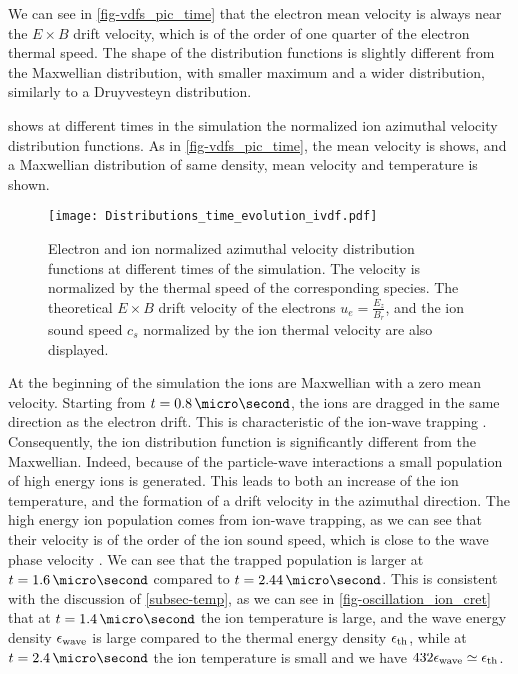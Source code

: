   We can see in \cref{fig-vdfs_pic_time} that the electron mean velocity is always near the $E \times B$ drift velocity, which is of the order of one quarter of the electron thermal speed.
  The shape of the distribution functions is slightly different from the Maxwellian distribution, with smaller maximum and a wider distribution, similarly to a Druyvesteyn distribution.
  
   shows at different times in the simulation the normalized ion azimuthal velocity distribution functions.
  As in \cref{fig-vdfs_pic_time}, the mean velocity is shows, and a Maxwellian distribution of same density, mean velocity and temperature is shown.


  
  \begin{figure}[!hbt]
    \centering
    \texttt{[image: Distributions\_time\_evolution\_ivdf.pdf]}
    \caption{Electron and ion normalized azimuthal velocity distribution functions at different times of the simulation. The velocity is normalized by the thermal speed of the corresponding species. The theoretical $E\times B$ drift velocity of the electrons $u_e = \frac{E_z}{B_r}$, and the ion sound speed $c_s$ normalized by the ion thermal velocity are also displayed.}
    \label{fig-ivdfs_pic_time}
  \end{figure}
  
  At the beginning of the simulation the ions are Maxwellian with a zero mean velocity.
  Starting from $t=0.8\,\micro\second$, the ions are dragged in the same direction as the electron drift.
  This is characteristic of the ion-wave trapping \citep{lafleur2017a}.
  Consequently, the ion distribution function is significantly different from the Maxwellian.
  Indeed, because of the particle-wave interactions a small population of high energy ions is generated. 
  This leads to both an increase of the ion temperature, and the formation of a drift velocity in the azimuthal direction.
  The high energy ion population comes from ion-wave trapping, as we can see that their velocity is of the order of the ion sound speed, which is close to the wave phase velocity \citep{lafleur2018}.
  We can see that the trapped population is larger at $t=1.6\,\micro\second$ compared to $t=2.44\,\micro\second$.
  This is consistent with the discussion of \cref{subsec-temp}, as we can see in \cref{fig-oscillation_ion_cret} that at $t=1.4\,\micro\second$  the ion temperature is large, and the wave energy density $\epsilon_{\rm wave}$ is large compared to the thermal energy density $\epsilon_{\rm th}$, while at $t=2.4\,\micro\second$ the ion temperature is small and we have $432\epsilon_{\rm wave} \simeq \epsilon_{\rm th}$.
  
